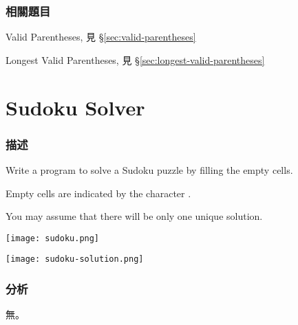 \subsubsection{相關題目}
\begindot
\item Valid Parentheses, 見 \S \ref{sec:valid-parentheses}
\item Longest Valid Parentheses, 見 \S \ref{sec:longest-valid-parentheses}
\myenddot


\section{Sudoku Solver} %
\label{sec:sudoku-solver}


\subsubsection{描述}
Write a program to solve a Sudoku puzzle by filling the empty cells.

Empty cells are indicated by the character .

You may assume that there will be only one unique solution.

\begin{center}
\texttt{[image: sudoku.png]}\\
\label{fig:sudoku}
\end{center}

\begin{center}
\texttt{[image: sudoku-solution.png]}\\
\label{fig:sudoku-solution}
\end{center}


\subsubsection{分析}
無。


